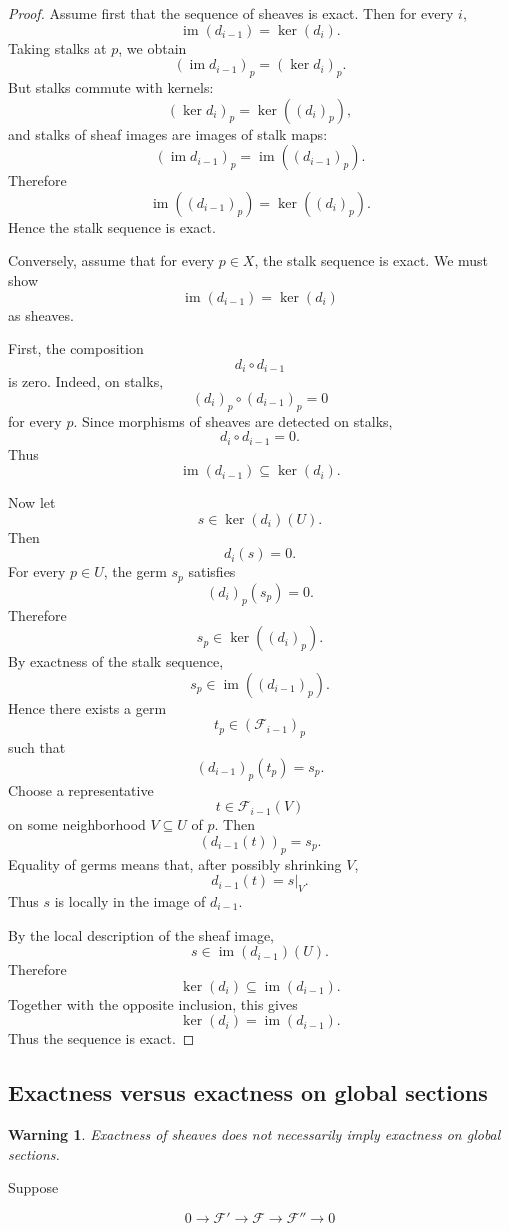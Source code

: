 \documentclass[12pt,a4paper]{article}
\DeclareMathOperator{\im}{im}
\theoremstyle{notespace}
\newtheorem{warning}[definition]{Warning}
\begin{document}
\begin{proof}
	Assume first that the sequence of sheaves is exact.
	Then for every $i$,
	\[
	\im(d_{i-1})=\ker(d_i).
	\]
	Taking stalks at $p$, we obtain
	\[
	(\im d_{i-1})_p=(\ker d_i)_p.
	\]
	But stalks commute with kernels:
	\[
	(\ker d_i)_p=\ker((d_i)_p),
	\]
	and stalks of sheaf images are images of stalk maps:
	\[
	(\im d_{i-1})_p=\im((d_{i-1})_p).
	\]
	Therefore
	\[
	\im((d_{i-1})_p)=\ker((d_i)_p).
	\]
	Hence the stalk sequence is exact.
	
	Conversely, assume that for every $p \in X$, the stalk sequence is exact.
	We must show
	\[
	\im(d_{i-1})=\ker(d_i)
	\]
	as sheaves.
	
	First, the composition
	\[
	d_i\circ d_{i-1}
	\]
	is zero.
	Indeed, on stalks,
	\[
	(d_i)_p\circ (d_{i-1})_p=0
	\]
	for every $p$.
	Since morphisms of sheaves are detected on stalks,
	\[
	d_i\circ d_{i-1}=0.
	\]
	Thus
	\[
	\im(d_{i-1})\subseteq \ker(d_i).
	\]
	
	Now let
	\[
	s \in \ker(d_i)(U).
	\]
	Then
	\[
	d_i(s)=0.
	\]
	For every $p \in U$, the germ $s_p$ satisfies
	\[
	(d_i)_p(s_p)=0.
	\]
	Therefore
	\[
	s_p \in \ker((d_i)_p).
	\]
	By exactness of the stalk sequence,
	\[
	s_p \in \im((d_{i-1})_p).
	\]
	Hence there exists a germ
	\[
	t_p \in (\mathcal F_{i-1})_p
	\]
	such that
	\[
	(d_{i-1})_p(t_p)=s_p.
	\]
	Choose a representative
	\[
	t \in \mathcal F_{i-1}(V)
	\]
	on some neighborhood $V \subseteq U$ of $p$.
	Then
	\[
	(d_{i-1}(t))_p=s_p.
	\]
	Equality of germs means that, after possibly shrinking $V$,
	\[
	d_{i-1}(t)=s|_V.
	\]
	Thus $s$ is locally in the image of $d_{i-1}$.
	
	By the local description of the sheaf image,
	\[
	s \in \im(d_{i-1})(U).
	\]
	Therefore
	\[
	\ker(d_i)\subseteq \im(d_{i-1}).
	\]
	Together with the opposite inclusion, this gives
	\[
	\ker(d_i)=\im(d_{i-1}).
	\]
	Thus the sequence is exact.
\end{proof}

\subsection{Exactness versus exactness on global sections}
\begin{warning}
	Exactness of sheaves does not necessarily imply exactness on global sections.
\end{warning}

Suppose

\[
0
\longrightarrow
\mathcal F'
\longrightarrow
\mathcal F
\longrightarrow
\mathcal F''
\longrightarrow
0
\]
\end{document}
